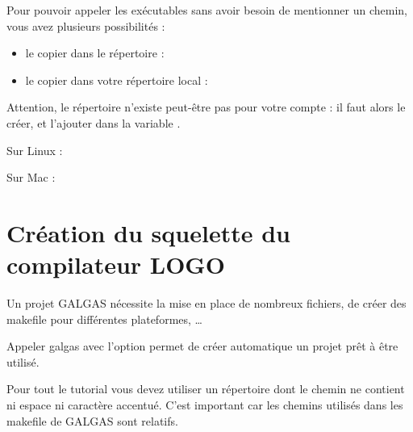 

Pour pouvoir appeler les exécutables sans avoir besoin de mentionner un chemin, vous avez plusieurs possibilités :
\begin{itemize}
  \item le copier dans le répertoire  :  
  \item le copier dans votre répertoire local  : 
\end{itemize}

Attention, le répertoire  n'existe peut-être pas pour votre compte : il faut alors le créer, et l'ajouter dans la variable .

Sur Linux :
\begin{description}
  \item[ ] 
  \item[ ] 
\end{description}

Sur Mac :
\begin{description}
  \item[ ] 
  \item[ ] 
\end{description}













\section{Création du squelette du compilateur LOGO}

Un projet GALGAS nécessite la mise en place de nombreux fichiers, de créer des makefile pour différentes plateformes, … 

Appeler galgas avec l'option  permet de créer automatique un projet prêt à être utilisé.

Pour tout le tutorial vous devez utiliser un répertoire dont le chemin ne contient ni espace ni caractère accentué. C'est important car les chemins utilisés dans les makefile de GALGAS sont relatifs.

